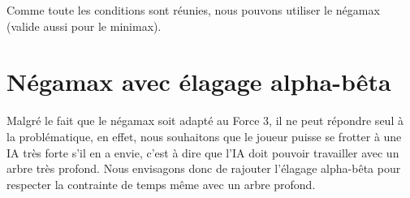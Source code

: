 Comme toute les conditions sont réunies, nous pouvons utiliser le négamax (valide aussi pour le minimax).

\section{Négamax avec élagage alpha-bêta}

Malgré le fait que le négamax soit adapté au Force 3, il ne peut répondre seul à
la problématique, en effet, nous souhaitons que le joueur puisse se frotter à une IA très forte
s'il en a envie, c'est à dire que l'IA doit pouvoir travailler avec un arbre très profond. Nous envisagons donc
de rajouter l'élagage alpha-bêta pour respecter la contrainte de temps même avec un arbre profond.

